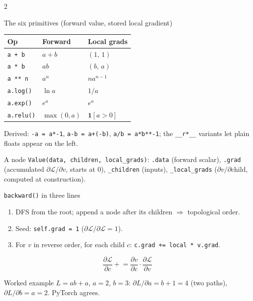 \documentclass[10pt,letterpaper]{article}
\newcommand{\code}[1]{\lstinline[basicstyle=\ttfamily\small]|#1|}
\newcommand{\dd}[2]{\frac{\partial #1}{\partial #2}}
\begin{document}
\begin{multicols}{2}
\begin{cs}{The six primitives (forward value, stored local gradient)}
\begin{tabular}{@{}lll@{}}
\toprule
Op & Forward & Local grads \\
\midrule
\code{a + b} & $a+b$ & $(1,\,1)$ \\
\code{a * b} & $ab$ & $(b,\,a)$ \\
\code{a ** n} & $a^n$ & $n a^{n-1}$ \\
\code{a.log()} & $\ln a$ & $1/a$ \\
\code{a.exp()} & $e^a$ & $e^a$ \\
\code{a.relu()} & $\max(0,a)$ & $\mathbf 1[a>0]$ \\
\bottomrule
\end{tabular}

Derived: \code{-a = a*-1}, \code{a-b = a+(-b)}, \code{a/b = a*b**-1}; the \code{__r*__} variants let plain floats appear on the left.
\end{cs}

\begin{cs}{A node}
\code{Value(data, children, local_grads)}: \code{.data} (forward scalar), \code{.grad} (accumulated $\partial\mathcal L/\partial v$, starts at 0), \code{_children} (inputs), \code{_local_grads} ($\partial v/\partial \text{child}$, computed at construction).
\end{cs}

\begin{cs}{\code{backward()} in three lines}
\begin{enumerate}
  \item DFS from the root; append a node after its children $\Rightarrow$ topological order.
  \item Seed: \code{self.grad = 1} ($\partial\mathcal L/\partial\mathcal L=1$).
  \item For $v$ in reverse order, for each child $c$: \code{c.grad += local * v.grad}.
\end{enumerate}
\[
\dd{\mathcal L}{c} \mathrel{+}= \dd{v}{c}\cdot\dd{\mathcal L}{v}
\]
\end{cs}

\begin{cs}{Worked example}
$L = ab + a$, $a=2$, $b=3$: $\partial L/\partial a = b + 1 = 4$ (two paths), $\partial L/\partial b = a = 2$. PyTorch agrees.
\end{cs}

\columnbreak


\end{multicols}
\end{document}
